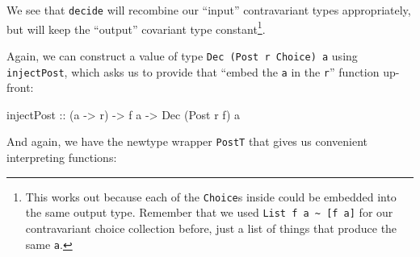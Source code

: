 \documentclass[]{article}
\newenvironment{Shaded}{}{}
\newcommand{\DataTypeTok}[1]{\textcolor[rgb]{0.56,0.13,0.00}{#1}}
\newcommand{\NormalTok}[1]{#1}
\newcommand{\OtherTok}[1]{\textcolor[rgb]{0.00,0.44,0.13}{#1}}
\begin{document}
We see that \texttt{decide} will recombine our ``input'' contravariant types
appropriately, but will keep the ``output'' covariant type constant\footnote{This
  works out because each of the \texttt{Choice}s inside could be embedded into
  the same output type. Remember that we used
  \texttt{List\ f\ a\ \textasciitilde{}\ {[}f\ a{]}} for our contravariant
  choice collection before, just a list of things that produce the same
  \texttt{a}.}.

Again, we can construct a value of type \texttt{Dec\ (Post\ r\ Choice)\ a} using
\texttt{injectPost}, which asks us to provide that ``embed the \texttt{a} in the
\texttt{r}'' function up-front:

\begin{Shaded}
\begin{Highlighting}[]
\OtherTok{injectPost ::}\NormalTok{ (a }\OtherTok{{-}\textgreater{}}\NormalTok{ r) }\OtherTok{{-}\textgreater{}}\NormalTok{ f a }\OtherTok{{-}\textgreater{}} \DataTypeTok{Dec}\NormalTok{ (}\DataTypeTok{Post}\NormalTok{ r f) a}
\end{Highlighting}
\end{Shaded}

And again, we have the newtype wrapper \texttt{PostT} that gives us convenient
interpreting functions:
\end{document}
